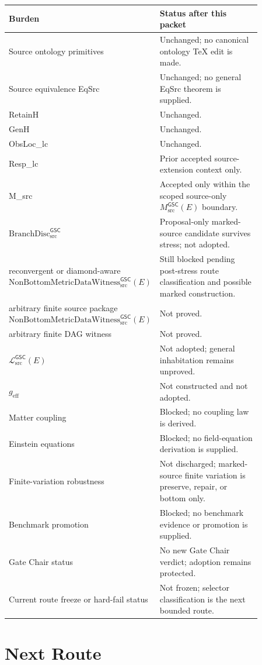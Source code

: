 \documentclass[11pt]{article}
\newcommand{\Witness}{\mathrm{NonBottomMetricDataWitness}_{\mathrm{src}}^{\mathsf{GSC}}}
\newcommand{\MetricData}{\mathcal{L}_{\mathrm{src}}^{\mathsf{GSC}}}
\newcommand{\geff}{g_{\mathrm{eff}}}
\newcommand{\BranchDisc}{\mathrm{BranchDisc}_{\mathrm{src}}^{\mathsf{GSC}}}
\begin{document}
\begin{longtable}{p{0.30\linewidth}p{0.56\linewidth}}
\toprule
Burden & Status after this packet \\
\midrule
Source ontology primitives & Unchanged; no canonical ontology TeX edit is made. \\
Source equivalence EqSrc & Unchanged; no general EqSrc theorem is supplied. \\
RetainH & Unchanged. \\
GenH & Unchanged. \\
ObsLoc\_lc & Unchanged. \\
Resp\_lc & Prior accepted source-extension context only. \\
M\_src & Accepted only within the scoped source-only \(M_{\mathrm{src}}^{\mathsf{GSC}}(E)\) boundary. \\
\(\BranchDisc\) & Proposal-only marked-source candidate survives stress; not adopted. \\
reconvergent or diamond-aware \(\Witness(E)\) & Still blocked pending post-stress route classification and possible marked construction. \\
arbitrary finite source package \(\Witness(E)\) & Not proved. \\
arbitrary finite DAG witness & Not proved. \\
\(\MetricData(E)\) & Not adopted; general inhabitation remains unproved. \\
\(\geff\) & Not constructed and not adopted. \\
Matter coupling & Blocked; no coupling law is derived. \\
Einstein equations & Blocked; no field-equation derivation is supplied. \\
Finite-variation robustness & Not discharged; marked-source finite variation is preserve, repair, or bottom only. \\
Benchmark promotion & Blocked; no benchmark evidence or promotion is supplied. \\
Gate Chair status & No new Gate Chair verdict; adoption remains protected. \\
Current route freeze or hard-fail status & Not frozen; selector classification is the next bounded route. \\
\bottomrule
\end{longtable}

\section{Next Route}
\end{document}
